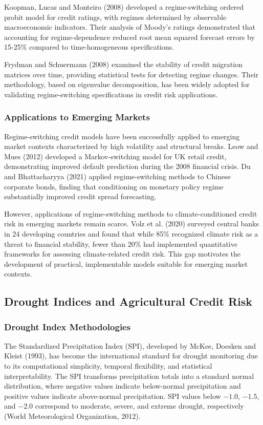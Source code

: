 \documentclass[12pt,a4paper]{article}
\begin{document}
Koopman, Lucas and Monteiro (2008) developed a regime-switching ordered probit model for credit ratings, with regimes determined by observable macroeconomic indicators. Their analysis of Moody's ratings demonstrated that accounting for regime-dependence reduced root mean squared forecast errors by 15-25\% compared to time-homogeneous specifications.

Frydman and Schuermann (2008) examined the stability of credit migration matrices over time, providing statistical tests for detecting regime changes. Their methodology, based on eigenvalue decomposition, has been widely adopted for validating regime-switching specifications in credit risk applications.

\subsubsection{Applications to Emerging Markets}

Regime-switching credit models have been successfully applied to emerging market contexts characterized by high volatility and structural breaks. Leow and Mues (2012) developed a Markov-switching model for UK retail credit, demonstrating improved default prediction during the 2008 financial crisis. Du and Bhattacharyya (2021) applied regime-switching methods to Chinese corporate bonds, finding that conditioning on monetary policy regime substantially improved credit spread forecasting.

However, applications of regime-switching methods to climate-conditioned credit risk in emerging markets remain scarce. Volz et al. (2020) surveyed central banks in 24 developing countries and found that while 85\% recognized climate risk as a threat to financial stability, fewer than 20\% had implemented quantitative frameworks for assessing climate-related credit risk. This gap motivates the development of practical, implementable models suitable for emerging market contexts.

\subsection{Drought Indices and Agricultural Credit Risk}

\subsubsection{Drought Index Methodologies}

The Standardized Precipitation Index (SPI), developed by McKee, Doesken and Kleist (1993), has become the international standard for drought monitoring due to its computational simplicity, temporal flexibility, and statistical interpretability. The SPI transforms precipitation totals into a standard normal distribution, where negative values indicate below-normal precipitation and positive values indicate above-normal precipitation. SPI values below $-1.0$, $-1.5$, and $-2.0$ correspond to moderate, severe, and extreme drought, respectively (World Meteorological Organization, 2012).
\end{document}
